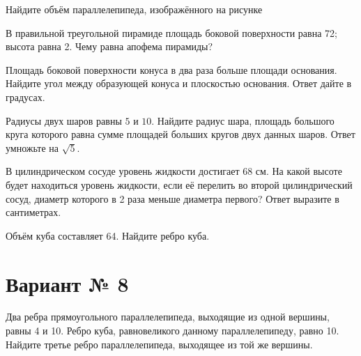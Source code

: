 \documentclass[4apaper]{article}
\begin{document}
\begin{taskBN}{1}
Найдите объём параллелепипеда, изображённого на рисунке
\end{taskBN}
\vspace*{1.3cm}

\begin{taskBN}{2}
В правильной треугольной пирамиде площадь боковой поверхности равна 72; высота равна 2. Чему равна апофема пирамиды?
\end{taskBN}

\begin{taskBN}{3}
Площадь боковой поверхности конуса в два раза больше площади основания. Найдите угол между образующей конуса и плоскостью основания. Ответ дайте в градусах.
\end{taskBN}

\begin{taskBN}{4}
Радиусы двух шаров равны $5$ и $10$. Найдите радиус шара, площадь большого круга которого равна сумме площадей больших кругов двух данных шаров. Ответ умножьте на $\sqrt{5}$.
\end{taskBN}

\begin{taskBN}{5}
В цилиндрическом сосуде уровень жидкости достигает 68 см. На какой высоте будет находиться уровень жидкости, если её перелить во второй цилиндрический сосуд, диаметр которого в 2 раза меньше диаметра первого? Ответ выразите в сантиметрах.
\end{taskBN}

\begin{taskBN}{6}
Объём куба составляет 64. Найдите ребро куба.
\end{taskBN}
\newpage\section*{Вариант № 8}

\begin{taskBN}{1}
Два ребра прямоугольного параллелепипеда, выходящие из одной вершины, равны 4 и 10. Ребро куба, равновеликого данному параллелепипеду, равно 10. Найдите третье ребро параллелепипеда, выходящее из той же вершины.
\end{taskBN}
\end{document}
